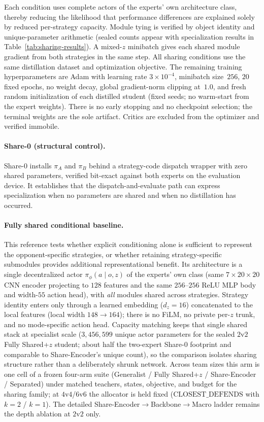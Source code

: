 Each condition uses complete actors of the experts' own architecture class,
thereby reducing the likelihood that performance differences are explained solely
by reduced per-strategy capacity. Module tying is verified by object identity
and unique-parameter arithmetic (sealed counts appear with specialization results
in Table~\ref{tab:sharing-results}). A mixed-$z$ minibatch gives each shared module
gradient from both strategies in the same step.
All sharing conditions use the same distillation dataset and optimization
objective.
The remaining training hyperparameters are Adam with learning rate $3{\times}10^{-4}$,
minibatch size~$256$, $20$ fixed epochs, no weight decay, global gradient-norm
clipping at~$1.0$, and fresh random initialization of each distilled student
(fixed seeds; no warm-start from the expert weights).
There is no early stopping and no checkpoint selection; the terminal weights
are the sole artifact.
Critics are excluded from the optimizer and verified immobile.

\paragraph{Share-0 (structural control).}
Share-0 installs $\pi_A$ and $\pi_B$ behind a strategy-code dispatch wrapper with
zero shared parameters, verified bit-exact against both experts on the
evaluation device. It establishes that the dispatch-and-evaluate path can
express specialization when no parameters are shared and when no distillation
has occurred.

\paragraph{Fully shared conditional baseline.}
This reference tests whether explicit conditioning alone is sufficient to
represent the opponent-specific strategies, or whether retaining
strategy-specific submodules provides additional representational benefit.
Its architecture is a single decentralized actor $\pi_\phi(a\mid o,z)$ of the
experts' own class (same $7{\times}20{\times}20$ CNN encoder projecting to $128$
features and the same $256$--$256$ ReLU MLP body and width-$55$ action head),
with \emph{all} modules shared across strategies.
Strategy identity enters only through a learned embedding
($d_z{=}16$) concatenated to the local features
(local width $148\!\to\!164$); there is no FiLM, no private per-$z$ trunk, and no
mode-specific action head.
Capacity matching keeps that single shared stack at specialist scale
($3{,}456{,}599$ unique actor parameters for the sealed $2$v$2$ Fully Shared+$z$
student; about half the two-expert Share-0 footprint and comparable to
Share-Encoder's unique count), so the comparison isolates sharing structure
rather than a deliberately shrunk network.
Across team sizes this arm is one cell of a frozen four-arm suite
(Generalist / Fully Shared+$z$ / Share-Encoder / Separated) under matched
teachers, states, objective, and budget for the sharing family; at $4$v$4$/$6$v$6$
the allocator is held fixed ($\mathrm{CLOSEST\_DEFENDS}$ with $k{=}2$ / $k{=}1$).
The detailed Share-Encoder$\rightarrow$Backbone$\rightarrow$Macro ladder remains the
depth ablation at $2$v$2$ only.

